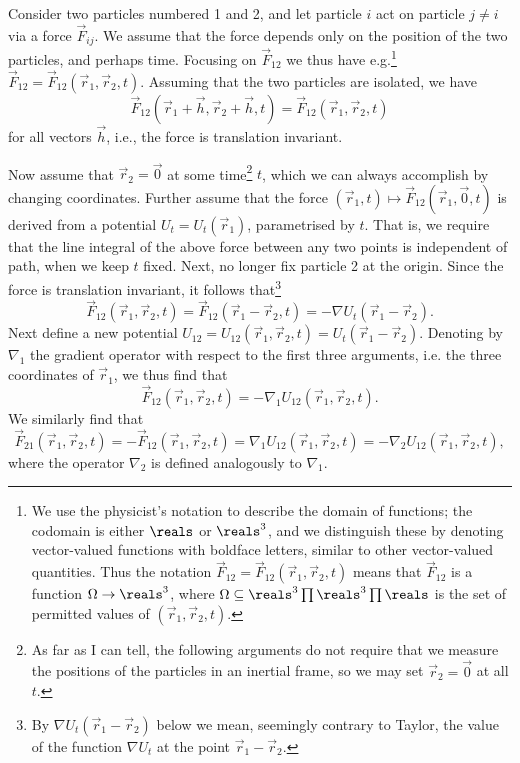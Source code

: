 \documentclass[article, a4paper, 11pt, oneside]{memoir}
\numberwithin{equation}{chapter}
\newcommand{\grad}{\nabla}
\begin{document}
Consider two particles numbered 1 and 2, and let particle $i$ act on particle $j \neq i$ via a force $\vec{F}_{ij}$. We assume that the force depends only on the position of the two particles, and perhaps time. Focusing on $\vec{F}_{12}$ we thus have e.g.\footnote{We use the physicist's notation to describe the domain of functions; the codomain is either $\reals$ or $\reals^3$, and we distinguish these by denoting vector-valued functions with boldface letters, similar to other vector-valued quantities. Thus the notation $\vec{F}_{12} = \vec{F}_{12}(\vec{r}_1, \vec{r}_2, t)$ means that $\vec{F}_{12}$ is a function $\Omega \to \reals^3$, where $\Omega \subseteq \reals^3 \prod \reals^3 \prod \reals$ is the set of permitted values of $(\vec{r}_1, \vec{r}_2, t)$.} $\vec{F}_{12} = \vec{F}_{12}(\vec{r}_1, \vec{r}_2, t)$. Assuming that the two particles are isolated, we have
%
\begin{equation*}
    \vec{F}_{12}(\vec{r}_1 + \vec{h}, \vec{r}_2 + \vec{h}, t)
    = \vec{F}_{12}(\vec{r}_1, \vec{r}_2, t)
\end{equation*}
%
for all vectors $\vec{h}$, i.e., the force is translation invariant.

Now assume that $\vec{r}_2 = \vec{0}$ at some time\footnote{As far as I can tell, the following arguments do not require that we measure the positions of the particles in an inertial frame, so we may set $\vec{r}_2 = \vec{0}$ at all $t$.} $t$, which we can always accomplish by changing coordinates. Further assume that the force $(\vec{r}_1, t) \mapsto \vec{F}_{12}(\vec{r}_1, \vec{0}, t)$ is derived from a potential $U_t = U_t(\vec{r}_1)$, parametrised by $t$. That is, we require that the line integral of the above force between any two points is independent of path, when we keep $t$ fixed. Next, no longer fix particle 2 at the origin. Since the force is translation invariant, it follows that\footnote{By $\grad U_t(\vec{r}_1 - \vec{r}_2)$ below we mean, seemingly contrary to Taylor, the value of the function $\grad U_t$ at the point $\vec{r}_1 - \vec{r}_2$.}
%
\begin{equation*}
    \vec{F}_{12}(\vec{r}_1, \vec{r}_2, t)
        = \vec{F}_{12}(\vec{r}_1 - \vec{r}_2, t)
        = -\grad U_t(\vec{r}_1 - \vec{r}_2).
\end{equation*}
%
Next define a new potential $U_{12} = U_{12}(\vec{r}_1, \vec{r}_{2}, t) = U_t(\vec{r}_1 - \vec{r}_2)$. Denoting by $\grad_1$ the gradient operator with respect to the first three arguments, i.e. the three coordinates of $\vec{r}_1$, we thus find that
%
\begin{equation*}
    \vec{F}_{12}(\vec{r}_1, \vec{r}_2, t)
        = -\grad_1 U_{12}(\vec{r}_1, \vec{r}_2, t).
\end{equation*}
%
We similarly find that
%
\begin{equation*}
    \vec{F}_{21}(\vec{r}_1, \vec{r}_2, t)
        = -\vec{F}_{12}(\vec{r}_1, \vec{r}_2, t)
        = \grad_1 U_{12}(\vec{r}_1, \vec{r}_2, t)
        = -\grad_2 U_{12}(\vec{r}_1, \vec{r}_2, t),
\end{equation*}
%
where the operator $\grad_2$ is defined analogously to $\grad_1$.
\end{document}
